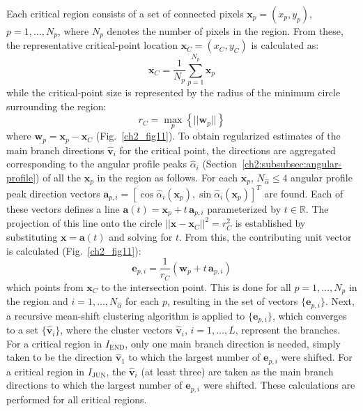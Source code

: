 Each critical region consists of a set of connected pixels $\mathbf{x}_p=(x_p,y_p)$, $p=1,\dots,N_p$, where $N_p$ denotes the number of pixels in the region. From these, the representative critical-point location $\mathbf{x}_C=(x_C,y_C)$ is calculated as:
\begin{equation}
\mathbf{x}_C=\frac{1}{N_p}\sum_{p=1}^{N_p}\mathbf{x}_p
\end{equation}
while the critical-point size is represented by the radius of the minimum circle surrounding the region:
\begin{equation}
r_C = \max_{p}\left\{||\mathbf{w}_p||\right\}
\end{equation}
where $\mathbf{w}_p=\mathbf{x}_p-\mathbf{x}_C$ (Fig.~\ref{ch2_fig11}). To obtain regularized estimates of the main branch directions $\hat{\mathbf{v}}_i$ for the critical point, the directions are aggregated corresponding to the angular profile peaks $\hat{\alpha}_i$ (Section~\ref{ch2:subsubsec:angular-profile}) of all the $\mathbf{x}_p$ in the region as follows. For each $\mathbf{x}_p$, $N_{\hat{\alpha}}\leq4$ angular profile peak direction vectors $\mathbf{a}_{p,i}=[\cos\hat{\alpha}_i(\mathbf{x}_p),\sin\hat{\alpha}_i(\mathbf{x}_p)]^T$ are found. Each of these vectors defines a line $\mathbf{a}(t)=\mathbf{x}_{p}+t\,\mathbf{a}_{p,i}$ parameterized by $t\in\mathbb{R}$. The projection of this line onto the circle $||\mathbf{x}-\mathbf{x}_C||^2=r^2_C$ is established by substituting $\mathbf{x}=\mathbf{a}(t)$ and solving for $t$. From this, the contributing unit vector is calculated (Fig.~\ref{ch2_fig11}):
\begin{equation}
\mathbf{e}_{p,i}=\frac{1}{r_C}(\mathbf{w}_{p}+t\,\mathbf{a}_{p,i})
\end{equation}
which points from $\mathbf{x}_C$ to the intersection point. This is done for all $p=1,\dots,N_p$ in the region and $i=1,\dots,N_{\hat{\alpha}}$ for each $p$, resulting in the set of vectors $\{\mathbf{e}_{p,i}\}$. Next, a recursive mean-shift clustering algorithm \cite{cheng1995mean} is applied to $\{\mathbf{e}_{p,i}\}$, which converges to a set $\{\hat{\mathbf{v}}_{i}\}$, where the cluster vectors $\hat{\mathbf{v}}_{i}$, $i=1,\dots,L$, represent the branches. For a critical region in $I_{\textrm{END}}$, only one main branch direction is needed, simply taken to be the direction $\hat{\mathbf{v}}_1$ to which the largest number of $\mathbf{e}_{p,i}$ were shifted. For a critical region in $I_{\textrm{JUN}}$, the $\hat{\mathbf{v}}_i$ (at least three) are taken as the main branch directions to which the largest number of $\mathbf{e}_{p,i}$ were shifted. These calculations are performed for all critical regions.

